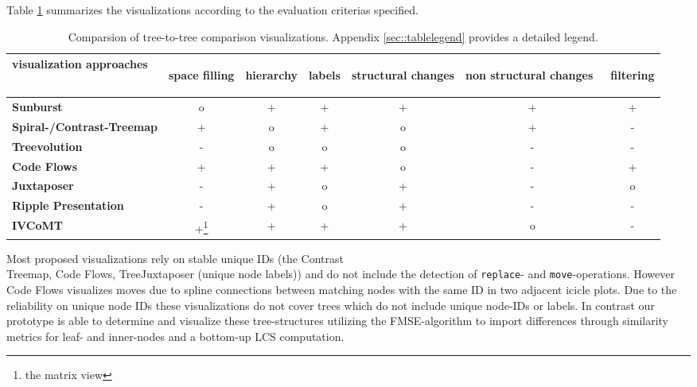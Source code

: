 Table \ref{chap5:comparsion} summarizes the visualizations according to the evaluation criterias specified.

\begin{table}[tb]
\centering 
\begin{tabular}[r]{|l|c|c|c|c|c|c|} 
\hline
\centering\textbf{visualization approaches} & \begin{sideways}\textbf{space filling}\end{sideways} & \begin{sideways}\textbf{hierarchy}\end{sideways} & \begin{sideways}\textbf{labels}\end{sideways} & \begin{sideways}\textbf{structural changes}\end{sideways} & \begin{sideways}\textbf{non structural changes\ }\end{sideways} & \begin{sideways}\textbf{filtering}\end{sideways}\\
\hline
\hline
\textbf{Sunburst} & o & + & +\footnotemark & + & + & +\\
\hline
\textbf{Spiral-/Contrast-Treemap} & + & o & + & o & + & -\\
\hline
\textbf{Treevolution} & - & o & o\footnotemark & o & - & -\\
\hline
\textbf{Code Flows} & + & + & + & o & - & +\\
\hline
\textbf{Juxtaposer} & - & + & o & + & - & o \\
\hline
\textbf{Ripple Presentation} & - & + & o & + & - & -\\
\hline
\textbf{IVCoMT} & +\footnote{the matrix view} & + & + & + & o & -\\
\hline
\end{tabular}
\label{chap5:comparsion}
\vspace{0.5em} 
\caption{Comparsion of tree-to-tree comparison visualizations. Appendix \ref{sec::tablelegend} provides a detailed legend.}
\end{table}

Most proposed visualizations rely on stable unique IDs (the Contrast\\Treemap\cite{tu2007visualizing}, Code Flows\cite{telea2008code}, TreeJuxtaposer\cite{munzner2003treejuxtaposer} (unique node labels)) and do not include the detection of \texttt{replace}- and \texttt{move}-operations. However Code Flows visualizes moves due to spline connections between matching nodes with the same ID in two adjacent icicle plots. Due to the reliability on unique node IDs these visualizations do not cover trees which do not include unique node-IDs or labels. In contrast our prototype is able to determine and visualize these tree-structures utilizing the FMSE-algorithm to import differences through similarity metrics for leaf- and inner-nodes and a bottom-up LCS computation.

